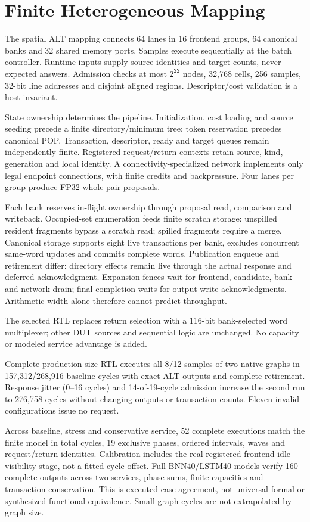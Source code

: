 \section{Finite Heterogeneous Mapping}
The spatial ALT mapping connects 64 lanes in 16 frontend groups, 64 canonical banks and 32 shared memory ports. Samples execute sequentially at the batch controller. Runtime inputs supply source identities and target counts, never expected answers. Admission checks at most $2^{22}$ nodes, 32,768 cells, 256 samples, 32-bit line addresses and disjoint aligned regions. Descriptor/cost validation is a host invariant.

State ownership determines the pipeline. Initialization, cost loading and source seeding precede a finite directory/minimum tree; token reservation precedes canonical POP. Transaction, descriptor, ready and target queues remain independently finite. Registered request/return contexts retain source, kind, generation and local identity. A connectivity-specialized network implements only legal endpoint connections, with finite credits and backpressure. Four lanes per group produce FP32 whole-pair proposals.

Each bank reserves in-flight ownership through proposal read, comparison and writeback. Occupied-set enumeration feeds finite scratch storage: unspilled resident fragments bypass a scratch read; spilled fragments require a merge. Canonical storage supports eight live transactions per bank, excludes concurrent same-word updates and commits complete words. Publication enqueue and retirement differ: directory effects remain live through the actual response and deferred acknowledgment. Expansion fences wait for frontend, candidate, bank and network drain; final completion waits for output-write acknowledgments. Arithmetic width alone therefore cannot predict throughput.

The selected RTL replaces return selection with a 116-bit bank-selected word multiplexer; other DUT sources and sequential logic are unchanged. No capacity or modeled service advantage is added.

Complete production-size RTL executes all 8/12 samples of two native graphs in 157,312/268,916 baseline cycles with exact ALT outputs and complete retirement. Response jitter (0--16 cycles) and 14-of-19-cycle admission increase the second run to 276,758 cycles without changing outputs or transaction counts. Eleven invalid configurations issue no request.

Across baseline, stress and conservative service, 52 complete executions match the finite model in total cycles, 19 exclusive phases, ordered intervals, waves and request/return identities. Calibration includes the real registered frontend-idle visibility stage, not a fitted cycle offset. Full BNN40/LSTM40 models verify 160 complete outputs across two services, phase sums, finite capacities and transaction conservation. This is executed-case agreement, not universal formal or synthesized functional equivalence. Small-graph cycles are not extrapolated by graph size.
